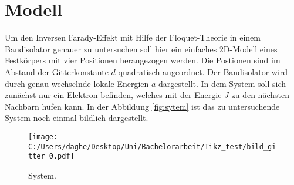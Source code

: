 \chapter{Modell}
Um den Inversen Farady-Effekt mit Hilfe der Floquet-Theorie in
einem Bandisolator genauer zu untersuchen soll hier ein einfaches 2D-Modell
eines Festkörpers mit vier Positionen herangezogen werden.
Die Postionen sind im Abstand der Gitterkonstante $d$ quadratisch angeordnet.
Der Bandisolator wird durch
genau wechselnde lokale Energien $a$ dargestellt.
In dem System soll sich zunächst nur ein Elektron befinden, welches mit der Energie
$J$ zu den nächsten Nachbarn hüfen kann.
In der Abbildung \ref{fig:sytem}
ist das zu untersuchende System noch einmal bildlich dargestellt.

\begin{figure}
   \centering
   \texttt{[image: C:/Users/daghe/Desktop/Uni/Bachelorarbeit/Tikz\_test/bild\_gitter\_0.pdf]}
   \caption{System.}
   \label{fig:system}
\end{figure}




